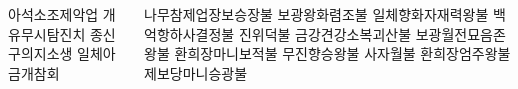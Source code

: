 \documentclass[20pt, a0paper ]{tikzposter}
\begin{document}
\begin{columns}
{\begin{LARGE}
					아석소조제악업 %
					개유무시탐진치 %
					종신구의지소생 %
					일체아금개참회 %

				\end{LARGE}

			}



			{

				\begin{LARGE}

					나무참제업장보승장불 보광왕화렴조불 일체향화자재력왕불
					백억항하사결정불 진위덕불 금강견강소복괴산불
					보광월전묘음존왕불 환희장마니보적불 무진향승왕불
					사자월불 환희장엄주왕불 제보당마니승광불


				\end{LARGE}


			}



			{

}
\end{columns}
\end{document}
